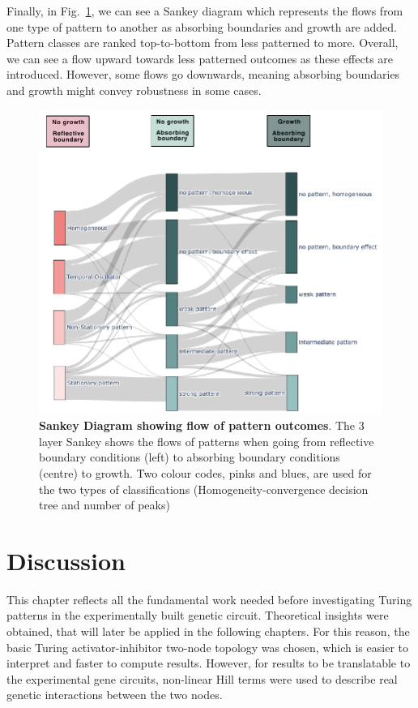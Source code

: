 Finally, in Fig.~\ref{fig:3layer_sankey}, we can see a Sankey diagram which represents the flows from one type of pattern to another as absorbing boundaries and growth are added.
Pattern classes are ranked top-to-bottom from less patterned to more.
Overall, we can see a flow upward towards less patterned outcomes as these effects are introduced.
However, some flows go downwards, meaning absorbing boundaries and growth might convey robustness in some cases.

\begin{figure}[H] %
    \centering
    \begin{adjustbox}{center}
        \includegraphics[width=1\textwidth]{chapters/Chapter 1/3layer_sankey} %
    \end{adjustbox}
    \caption{\textbf{Sankey Diagram showing flow of pattern outcomes}. The 3 layer Sankey shows the flows of patterns when going from reflective boundary conditions (left) to absorbing boundary conditions (centre) to growth. Two colour codes, pinks and blues, are used for the two types of classifications (Homogeneity-convergence decision tree and number of peaks)}
    \label{fig:3layer_sankey} %
\end{figure}


\section{Discussion}
This chapter reflects all the fundamental work needed before investigating Turing patterns in the experimentally built genetic circuit.
Theoretical insights were obtained, that will later be applied in the following chapters.
For this reason, the basic Turing activator-inhibitor two-node topology was chosen, which is easier to interpret and faster to compute results.
However, for results to be translatable to the experimental gene circuits, non-linear Hill terms were used to describe real genetic interactions between the two nodes.

